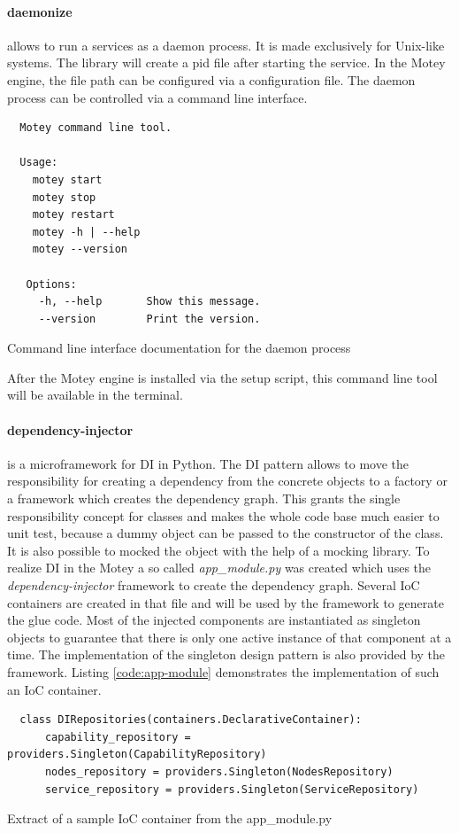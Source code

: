 \paragraph{daemonize}\label{library:daemonize} allows to run a services as a daemon process.
It is made exclusively for Unix-like systems.
The library will create a pid file after starting the service.
In the Motey engine, the file path can be configured via a configuration file.
The daemon process can be controlled via a command line interface.
\begin{listing}[H]
  \begin{verbatim}
  Motey command line tool.

  Usage:
    motey start
    motey stop
    motey restart
    motey -h | --help
    motey --version

   Options:
     -h, --help       Show this message.
     --version        Print the version.
  \end{verbatim}
  \caption{Command line interface documentation for the daemon process}
  \label{code:cli-tool}
\end{listing}
After the Motey engine is installed via the setup script, this command line tool will be available in the terminal.

\paragraph{dependency-injector} is a microframework for \acf{DI} in Python.
The \ac{DI} pattern allows to move the responsibility for creating a dependency from the concrete objects to a factory or a framework which creates the dependency graph.
This grants the single responsibility concept for classes and makes the whole code base much easier to unit test, because a dummy object can be passed to the constructor of the class.
It is also possible to mocked the object with the help of a mocking library.
To realize \ac{DI} in the Motey a so called \textit{app\_module.py} was created which uses the \textit{dependency-injector} framework to create the dependency graph.
Several \ac{IoC} containers are created in that file and will be used by the framework to generate the glue code.
Most of the injected components are instantiated as singleton objects to guarantee that there is only one active instance of that component at a time.
The implementation of the singleton design pattern is also provided by the framework.
Listing \ref{code:app-module} demonstrates the implementation of such an \ac{IoC} container.
\begin{listing}[H]
  \begin{verbatim}
  class DIRepositories(containers.DeclarativeContainer):
      capability_repository = providers.Singleton(CapabilityRepository)
      nodes_repository = providers.Singleton(NodesRepository)
      service_repository = providers.Singleton(ServiceRepository)
  \end{verbatim}
  \caption{Extract of a sample \ac{IoC} container from the app\_module.py}
  \label{code:app-module}
\end{listing}

